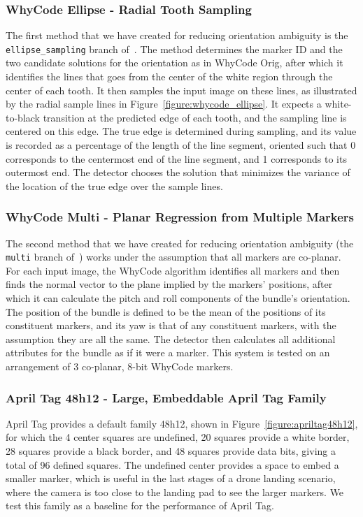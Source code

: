 \subsubsection{WhyCode Ellipse - Radial Tooth Sampling}
The first method that we have created for reducing orientation ambiguity is the \texttt{ellipse\_sampling} branch of~\cite{uzgit_whycon}.
The method determines the marker ID and the two candidate solutions for the orientation as in WhyCode Orig,
after which it identifies the lines that goes from the center of the white region through the center of each tooth.
It then samples the input image on these lines,
as illustrated by the radial sample lines in Figure~\ref{figure:whycode_ellipse}.
It expects a white-to-black transition at the predicted edge of each tooth, and the sampling line is centered on this edge.
The true edge is determined during sampling, and its value is recorded as a percentage of the length of the line segment,
oriented such that 0 corresponds to the centermost end of the line segment, and 1 corresponds to its outermost end.
The detector chooses the solution that minimizes the variance of the location of the true edge over the sample lines.

\subsubsection{WhyCode Multi - Planar Regression from Multiple Markers}
The second method that we have created for reducing orientation ambiguity (the \texttt{multi} branch of~\cite{uzgit_whycon})
works under the assumption that all markers are co-planar.
For each input image, the WhyCode algorithm identifies all markers and
then finds the normal vector to the plane implied by the markers' positions,
after which it can calculate the pitch and roll components of the bundle's orientation.
The position of the bundle is defined to be the mean of the positions of its constituent markers,
and its yaw is that of any constituent markers, with the assumption they are all the same.
The detector then calculates all additional attributes for the bundle as if it were a marker.
This system is tested on an arrangement of 3 co-planar, 8-bit WhyCode markers.

\subsubsection{April Tag 48h12 - Large, Embeddable April Tag Family}
April Tag provides a default family 48h12, shown in Figure~\ref{figure:apriltag48h12},
for which the 4 center squares are undefined,
20 squares provide a white border,
28 squares provide a black border,
and 48 squares provide data bits,
giving a total of 96 defined squares.
The undefined center provides a space to embed a smaller marker,
which is useful in the last stages of a drone landing scenario,
where the camera is too close to the landing pad to see the larger markers.
We test this family as a baseline for the performance of April Tag.

